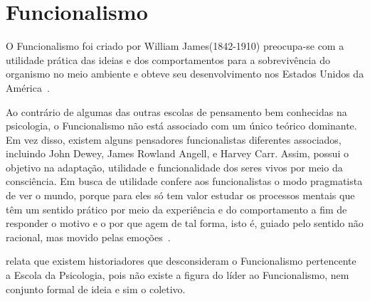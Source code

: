 \section{Funcionalismo}\label{funcionalismo}

O Funcionalismo foi criado por William James(1842-1910) preocupa-se com a utilidade prática das ideias e dos comportamentos para a sobrevivência do organismo no meio ambiente e obteve seu desenvolvimento nos Estados Unidos da América~\cite{hothersall1997historia}.

Ao contrário de algumas das outras escolas de pensamento bem conhecidas na psicologia, o Funcionalismo não está associado com um único teórico dominante. 
Em vez disso, existem alguns pensadores funcionalistas diferentes associados, incluindo John Dewey, James Rowland Angell, e Harvey Carr.
Assim, possui o objetivo na adaptação, utilidade e funcionalidade dos seres vivos por meio da consciência.
Em busca de utilidade confere aos funcionalistas o modo pragmatista de ver o mundo, porque para eles só tem valor estudar os processos mentais que têm um sentido prático por meio da experiência e do comportamento a fim de responder o motivo e o por que agem de tal forma, isto é, guiado pelo sentido não racional, mas movido pelas emoções~\cite{bock1999psicologias,silva2007psicologia_educacao}.

 relata que existem historiadores que desconsideram o Funcionalismo pertencente a Escola da Psicologia, pois não existe a figura do líder ao Funcionalismo, nem conjunto formal de ideia e sim o coletivo. 

